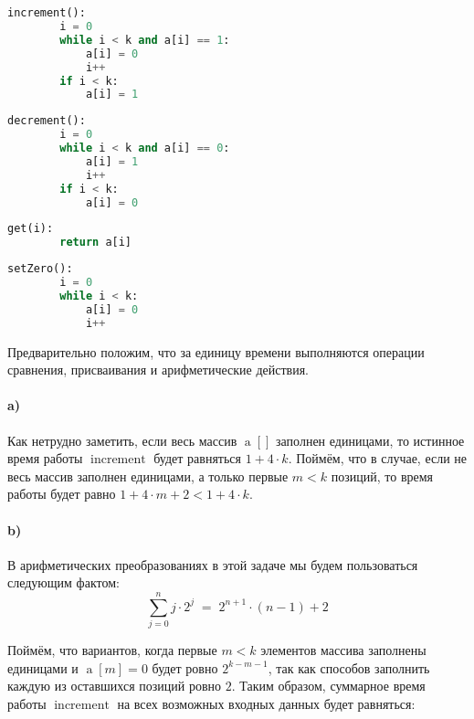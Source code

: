 \section{}
	\begin{lstlisting}[language=Python]
	increment():
		i = 0
		while i < k and a[i] == 1:
			a[i] = 0
			i++
		if i < k:
			a[i] = 1
	\end{lstlisting}
	
	\begin{lstlisting}[language=Python]
	decrement():
		i = 0
		while i < k and a[i] == 0:
			a[i] = 1
			i++
		if i < k:
			a[i] = 0
	\end{lstlisting}
	
	\begin{lstlisting}[language=Python]
	get(i):
		return a[i]
	\end{lstlisting}
	
	\begin{lstlisting}[language=Python]
	setZero():
		i = 0
		while i < k:
			a[i] = 0
			i++
	\end{lstlisting}
	
	Предварительно положим, что за единицу времени выполняются операции сравнения, присваивания и арифметические действия.
	
	\paragraph{a)}
	Как нетрудно заметить, если весь массив $\operatorname{a}[]$ заполнен единицами, то истинное время работы $\operatorname{increment}$ будет равняться $1 + 4\cdot k$. Поймём, что в случае, если не весь массив заполнен единицами, а только первые $m < k$ позиций, то время работы будет равно $1 + 4\cdot m + 2 < 1 + 4\cdot k$. 
	
	\paragraph{b)}
	
	\begin{lemma}
		В арифметических преобразованиях в этой задаче мы будем пользоваться следующим фактом:
		$$\sum_{j = 0}^{n} j\cdot 2^j \;=\; 2^{n+1}\cdot (n-1) + 2$$
	\end{lemma}
	
	Поймём, что вариантов, когда первые $m < k$ элементов массива заполнены единицами и $\operatorname{a}[m] = 0$ будет ровно $2^{k-m-1}$, так как способов заполнить каждую из оставшихся позиций ровно $2$. Таким образом, суммарное время работы $\operatorname{increment}$ на всех возможных входных данных будет равняться:
	
